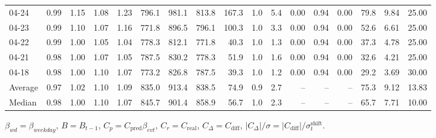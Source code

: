 \begin{threeparttable}
{\begin{tabular}{lrrrrrrrrrrrrrrrr}
  04-24 &         0.99 &           1.15 &          1.08 &          1.23 & 796.1 &  981.1 & 813.8 &      167.3 &                      1.0 &                 5.4 &       0.00 &      0.94 &           0.00 &             79.8 &            9.84 &                  25.00 \\
  04-23 &         0.99 &           1.10 &          1.07 &          1.16 & 771.8 &  896.5 & 796.1 &      100.3 &                      1.0 &                 3.3 &       0.00 &      0.94 &           0.00 &             52.6 &            6.61 &                  25.00 \\
  04-22 &         0.99 &           1.00 &          1.05 &          1.04 & 778.3 &  812.1 & 771.8 &       40.3 &                      1.0 &                 1.3 &       0.00 &      0.94 &           0.00 &             37.3 &            4.78 &                  25.00 \\
  04-21 &         0.98 &           1.00 &          1.07 &          1.05 & 787.5 &  830.2 & 778.3 &       51.9 &                      1.0 &                 1.6 &       0.00 &      0.94 &           0.00 &             32.6 &            4.21 &                  25.00 \\
  04-18 &         0.98 &           1.00 &          1.10 &          1.07 & 773.2 &  826.8 & 787.5 &       39.3 &                      1.0 &                 1.2 &       0.00 &      0.94 &           0.00 &             29.2 &            3.69 &                  30.00 \\
Average &         0.97 &           1.02 &          1.10 &          1.09 & 835.0 &  913.4 & 838.5 &       74.9 &                      0.9 &                 2.7 &         -- &        -- &             -- &             75.3 &            9.12 &                  13.83 \\
 Median &         0.98 &           1.00 &          1.10 &          1.07 & 845.7 &  901.4 & 858.9 &       56.7 &                      1.0 &                 2.3 &         -- &        -- &             -- &             65.7 &            7.71 &                  10.00 \\
\bottomrule
\end{tabular}
}
\begin{tablenotes}\footnotesize
\item $\beta_{wd}=\beta_{weekday}$, $B=B_{t-1}$,
$C_p=C_{\text{pred}}\beta_{evt}$, $C_r=C_{\text{real}}$,
$C_\Delta=C_{\text{diff}}$, $|C_\Delta|/\sigma=|C_{\text{diff}}|/\sigma_t^{\text{shift}}$.
\end{tablenotes}
\end{threeparttable}
\endgroup

